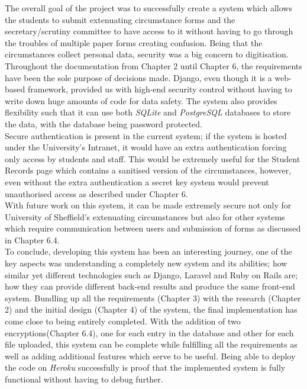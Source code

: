 \documentclass[../main.tex]{subfiles}
\begin{document}
\raggedright
The overall goal of the project was to successfully create a system which allows the students to submit extenuating circumstance forms and the secretary/scrutiny committee to have access to it without having to go through the troubles of multiple paper forms creating confusion. Being that the circumstances collect personal data, security was a big concern to digitisation. Throughout the documentation from Chapter 2 until Chapter 6, the requirements have been the sole purpose of decisions made. Django, even though it is a web-based framework, provided us with high-end security control without having to write down huge amounts of code for data safety. The system also provides flexibility such that it can use both \textit{SQLite} and \textit{PostgreSQL} databases to store the data, with the database being password protected. \\[4mm]

Secure authentication is present in the current system; if the system is hosted under the University's Intranet, it would have an extra authentication forcing only access by students and staff. This would be extremely useful for the Student Records page which contains a sanitised version of the circumstances, however, even without the extra authentication a secret key system would prevent unauthorised access as described under Chapter 6. \\[4mm]

With future work on this system, it can be made extremely secure not only for University of Sheffield's extenuating circumstances but also for other systems which require communication between users and submission of forms as discussed in Chapter 6.4. \\[4mm]

To conclude, developing this system has been an interesting journey, one of the key aspects was understanding a completely new system and its abilities; how similar yet different technologies such as Django, Laravel and Ruby on Rails are; how they can provide different back-end results and produce the same front-end system. Bundling up all the requirements  (Chapter 3) with the research (Chapter 2) and the initial design (Chapter 4) of the system, the final implementation has come close to being entirely completed. With the addition of two encryptions(Chapter 6.4), one for each entry in the database and other for each file uploaded, this system can be complete while fulfilling all the requirements as well as adding additional features which serve to be useful. Being able to deploy the code on \textit{Heroku} successfully is proof that the implemented system is fully functional without having to debug further.
\end{document}
